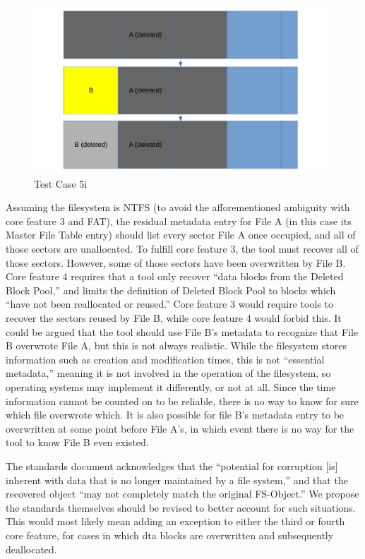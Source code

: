 \begin{figure}[h]
    \centering
    \includegraphics[width=\linewidth]{fig/case5i.png}
    \caption{Test Case 5i}
    \label{fig:case_5i}
\end{figure}

Assuming the filesystem is NTFS (to avoid the afforementioned ambiguity with core feature 3 and FAT), the residual metadata entry for File A (in this case its Master File Table entry) should list every sector File A once occupied, and all of those sectors are unallocated. 
To fulfill core feature 3, the tool must recover all of those sectors. 
However, some of those sectors have been overwritten by File B. Core feature 4 requires that a tool only recover ``data blocks from the Deleted Block Pool,''\cite{meta:dfr:standards} and limits the definition of Deleted Block Pool to blocks which ``have not been reallocated or reused.''\cite{meta:dfr:standards}
Core feature 3 would require tools to recover the sectors reused by File B, while core feature 4 would forbid this. 
It could be argued that the tool should use File B's metadata to recognize that File B overwrote File A, but this is not always realistic. 
While the filesystem stores information such as creation and modification times, this is not ``essential metadata,'' meaning it is not involved in the operation of the filesystem, so operating systems may implement it differently, or not at all.\cite{carrier:filesystems}
Since the time information cannot be counted on to be reliable, there is no way to know for sure which file overwrote which. 
It is also possible for file B's metadata entry to be overwritten at some point before File A's, in which event there is no way for the tool to know File B even existed.

The standards document acknowledges that the ``potential for corruption [is] inherent with data that is no longer maintained by a file system,''\cite{meta:dfr:standards} and that the recovered object ``may not completely match the original FS-Object.''\cite{meta:dfr:standards}
We propose the standards themselves should be revised to better account for such situations.
This would most likely mean adding an exception to either the third or fourth core feature, for cases in which dta blocks are overwritten and subsequently deallocated.
